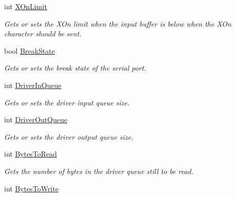 \begin{DoxyCompactItemize}
int \mbox{\hyperlink{class_r_j_c_p_1_1_i_o_1_1_ports_1_1_native_1_1_win_native_serial_a33c81ce663d8a1a78c74be34fe80492b}{X\+On\+Limit}}
\begin{DoxyCompactList}\small\item\em Gets or sets the X\+On limit when the input buffer is below when the X\+On character should be sent. \end{DoxyCompactList}\item 
bool \mbox{\hyperlink{class_r_j_c_p_1_1_i_o_1_1_ports_1_1_native_1_1_win_native_serial_a0bfc3c17e97b361b7cf1963eea9a5daa}{Break\+State}}
\begin{DoxyCompactList}\small\item\em Gets or sets the break state of the serial port. \end{DoxyCompactList}\item 
int \mbox{\hyperlink{class_r_j_c_p_1_1_i_o_1_1_ports_1_1_native_1_1_win_native_serial_a896990d639f535f06bfe41e8343f8494}{Driver\+In\+Queue}}
\begin{DoxyCompactList}\small\item\em Gets or sets the driver input queue size. \end{DoxyCompactList}\item 
int \mbox{\hyperlink{class_r_j_c_p_1_1_i_o_1_1_ports_1_1_native_1_1_win_native_serial_a5bcff144464e9623c2f705e9aa12c3f8}{Driver\+Out\+Queue}}
\begin{DoxyCompactList}\small\item\em Gets or sets the driver output queue size. \end{DoxyCompactList}\item 
int \mbox{\hyperlink{class_r_j_c_p_1_1_i_o_1_1_ports_1_1_native_1_1_win_native_serial_ab4ff2e42c520b5d86773f996bf1af716}{Bytes\+To\+Read}}
\begin{DoxyCompactList}\small\item\em Gets the number of bytes in the driver queue still to be read. \end{DoxyCompactList}\item 
int \mbox{\hyperlink{class_r_j_c_p_1_1_i_o_1_1_ports_1_1_native_1_1_win_native_serial_a7575be31e3a48e5c5900dfc0a75e8349}{Bytes\+To\+Write}}

\end{DoxyCompactItemize}
